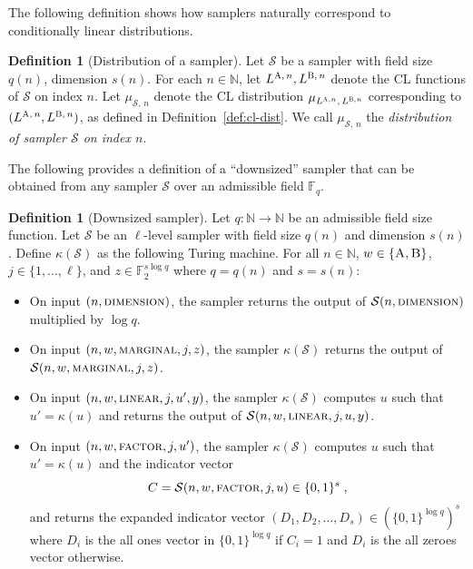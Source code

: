\documentclass[11pt]{article}
\theoremstyle{definition}
\newtheorem{definition}[theorem]{Definition}
\newcommand{\N}{\ensuremath{\mathbb{N}}}
\newcommand{\F}{\ensuremath{\mathbb{F}}}
\newcommand{\downsize}{\kappa}
\newcommand{\sampler}{\mathcal{S}}
\newcommand{\gamestyle}[1]{\ensuremath{\textsc{#1}}\xspace}
\newcommand{\labelstyle}[1]{\ensuremath{\textsc{#1}}\xspace}
\newcommand{\alice}{\labelstyle{A}}
\newcommand{\bob}{\labelstyle{B}}
\begin{document}
The following definition shows how samplers naturally correspond to
conditionally linear distributions.
\begin{definition}[Distribution of a sampler]
  \label{def:sampler-sample}
  Let $\sampler$ be a sampler with field size $q(n)$, dimension $s(n)$.
  For each $n \in \N$, let $L^{\alice,\, n}, L^{\bob,\, n}$ denote the CL
  functions of $\sampler$ on index $n$.
  Let $\mu_{\sampler,\, n}$ denote the CL distribution $\mu_{L^{\alice, n},\,
    L^{\bob, n}}$ corresponding to $(L^{\alice,\, n}, L^{\bob,\, n})$, as
  defined in Definition~\ref{def:cl-dist}.
  We call $\mu_{\sampler,\, n}$ the \emph{distribution of sampler $\sampler$ on
    index $n$}.
\end{definition}

The following provides a definition of a ``downsized'' sampler that can be
obtained from any sampler $\sampler$ over an admissible field $\F_q$.
\begin{definition}[Downsized sampler]
  \label{def:downsize_sampler}
	Let $q: \N \to \N$ be an admissible field size function.
  Let $\sampler$ be an $\ell$-level sampler with field size $q(n)$ and dimension
  $s(n)$.
  Define $\downsize(\sampler)$ as the following Turing machine.
  For all $n \in \N$, $w \in \{\alice,\bob\}$, $j \in \{1,\ldots,\ell\}$, and $z
  \in \F_2^{s \log q}$ where $q = q(n)$ and $s = s(n)$:
	\begin{itemize}
  \item On input $(n, \gamestyle{dimension})$, the sampler returns the output of
    $\sampler(n, \gamestyle{dimension})$ multiplied by $\log q$.
		
	\item On input $(n, w, \gamestyle{marginal}, j, z)$, the sampler
    $\downsize(\sampler)$ returns the output of $\sampler(n, w,
    \gamestyle{marginal}, j, z)$.
		
  \item On input $(n, w, \gamestyle{linear}, j, u', y)$, the sampler
    $\downsize(\sampler)$ computes $u$ such that $u' = \downsize(u)$ and returns
    the output of $\sampler(n, w, \gamestyle{linear}, j, u, y)$.
		
	\item On input $(n, w, \gamestyle{factor}, j, u')$, the sampler
    $\downsize(\sampler)$ computes $u$ such that $u' = \downsize(u)$ and the
    indicator vector
    \[
      C = \sampler(n, w, \gamestyle{factor}, j, u) \in \{0,1\}^s\;,
    \]
    and returns the expanded indicator vector $(D_1, D_2, \ldots, D_s) \in (\{0,
    1\}^{\log q})^s$ where $D_i$ is the all ones vector in $\{0, 1\}^{\log q}$
    if $C_i = 1$ and $D_i$ is the all zeroes vector otherwise.
  \end{itemize}
\end{definition}
\end{document}

